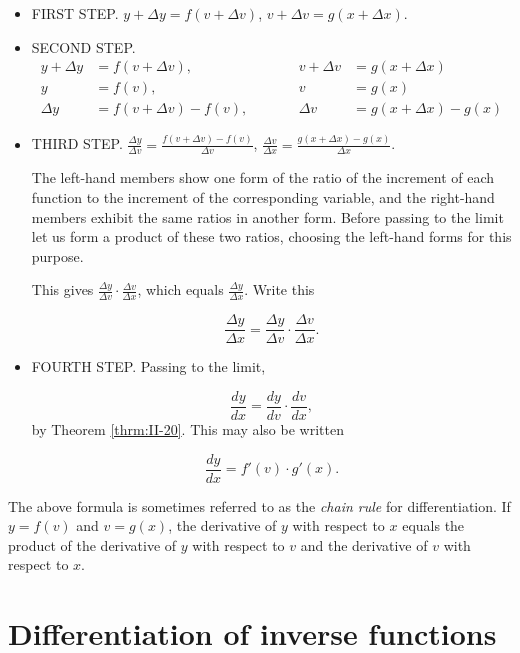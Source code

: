 \begin{itemize}
\item
FIRST STEP. $	y + \Delta y 	= f(v + \Delta v)$, 
$v + \Delta v = g(x + \Delta x)$.

\item
SECOND STEP.
\[
\begin{array}{rlcrl}
y + \Delta y &	= f(v + \Delta v), & \qquad &	
v + \Delta v &	= g (x + \Delta x)\\
y 	&= f(v), & \qquad &	v &	= g (x)\\
\Delta y 	&=f(v + \Delta v) - f(v),  & \qquad &	
\Delta v &=g (x + \Delta x) - g (x)
\end{array}
\]

\item
THIRD STEP. $	\frac{\Delta y}{\Delta v} 	
= \frac{f(v + \Delta v) - f(v)}{\Delta v} $,
$\frac{\Delta v}{\Delta x} =	\frac{g(x + \Delta x) - g(x)}{\Delta x}$.

The left-hand members show one form of the ratio of the increment of 
each function to the increment of the corresponding variable, 
and the right-hand 
members exhibit the same ratios in another form. Before passing to the limit 
let us form a product of these two ratios, choosing the 
left-hand forms for this purpose.

This gives $\frac{\Delta y}{\Delta v} \cdot \frac{\Delta v}{\Delta x}$, 
which equals $\frac{\Delta y}{\Delta x}$.
Write this 	

\[
\frac{\Delta y}{\Delta x} 	
= \frac{\Delta y}{\Delta v} \cdot \frac{\Delta v}{\Delta x}.
\]

\item
FOURTH STEP. Passing to the limit,

\begin{equation}
\frac{dy}{dx} 	= \frac{dy}{dv} \cdot \frac{dv}{dx},
\label{eqn:A-42}
\end{equation}
by Theorem \ref{thrm:II-20}.%
This may also be written

\[
	\frac{dy}{dx} 	= f'(v) \cdot g'(x).
\]

\end{itemize}
The above formula is sometimes referred to as the {\it chain rule} 
for differentiation. %
If $y = f(v)$ and $v = g(x)$, the derivative of $y$ with respect to $x$ equals 
the product of the derivative of $y$ with respect to $v$ and the derivative of 
$v$ with respect to $x$.

\section{Differentiation of inverse functions}

